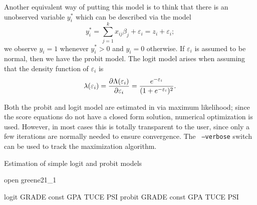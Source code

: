Another
equivalent way of putting this model is to think that there is an
unobserved variable $y^*_i$ which can be described via the model
\begin{equation}
  \label{eq:qr-latent}
  y^*_i = \sum_{j=1}^k x_{ij} \beta_j + \varepsilon_i = z_i  +
  \varepsilon_i ;
\end{equation}
we observe $y_i = 1$ whenever $y^*_i > 0$ and $y_i = 0$ otherwise. If
$\varepsilon_i$ is assumed to be normal, then we have the probit
model. The logit model arises when assuming that the density function of
$\varepsilon_i$ is 
\[
  \lambda(\varepsilon_i) =
  \frac{\partial \Lambda(\varepsilon_i)}{\partial \varepsilon_i} =
  \frac{e^{-\varepsilon_i}}{(1 + e^{-\varepsilon_i})^2} .
\]

Both the probit and logit model are estimated in  via
maximum likelihood; since the score equations do not have a closed
form solution, numerical optimization is used. However, in most cases
this is totally transparent to the user, since only a few iterations
are normally needed to ensure convergence. The \texttt{ --verbose}
switch can be used to track the maximization algorithm.

\begin{script}[htbp]
  \caption{Estimation of simple logit and probit models}
  \label{simple-QR}
\begin{code}
open greene21_1

logit GRADE const GPA TUCE PSI
probit GRADE const GPA TUCE PSI
\end{code}
\end{script}

